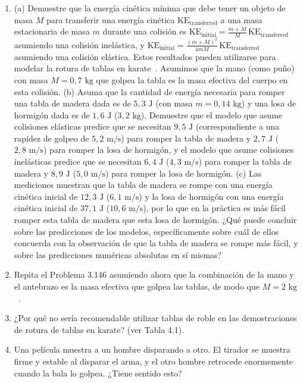 \documentclass[12pt]{book}
\begin{document}
\begin{enumerate}
\item[3.146] (a) Demuestre que la energía cinética mínima que debe tener un objeto de masa $M$ para transferir una energía cinética $\text{KE}_{\text{transferred}}$ a una masa estacionaria de masa $m$ durante una colisión es $\text{KE}_{\text{initial}} = \frac{m + M}{M}\,\text{KE}_{\text{transferred}}$ asumiendo una colisión inelástica, y $\text{KE}_{\text{initial}} = \frac{(m + M)^2}{4mM}\,\text{KE}_{\text{transferred}}$ asumiendo una colisión elástica. Estos resultados pueden utilizarse para modelar la rotura de tablas en karate~\cite{ref144}. Asumimos que la mano (como puño) con masa $M = 0{,}7\text{ kg}$ que golpea la tabla es la masa efectiva del cuerpo en esta colisión.
\newline
(b) Asuma que la cantidad de energía necesaria para romper una tabla de madera dada es de $5{,}3\text{ J}$ (con masa $m = 0{,}14\text{ kg}$) y una losa de hormigón dada es de $1{,}6\text{ J}$ ($3{,}2\text{ kg}$). Demuestre que el modelo que asume colisiones elásticas predice que se necesitan $9{,}5\text{ J}$ (correspondiente a una rapidez de golpeo de $5{,}2\text{ m/s}$) para romper la tabla de madera y $2{,}7\text{ J}$ ($2{,}8\text{ m/s}$) para romper la losa de hormigón, y el modelo que asume colisiones inelásticas predice que se necesitan $6{,}4\text{ J}$ ($4{,}3\text{ m/s}$) para romper la tabla de madera y $8{,}9\text{ J}$ ($5{,}0\text{ m/s}$) para romper la losa de hormigón.
\newline
(c) Las mediciones muestran que la tabla de madera se rompe con una energía cinética inicial de $12{,}3\text{ J}$ ($6{,}1\text{ m/s}$) y la losa de hormigón con una energía cinética inicial de $37{,}1\text{ J}$ ($10{,}6\text{ m/s}$), por lo que en la práctica es más fácil romper esta tabla de madera que esta losa de hormigón. ¿Qué puede concluir sobre las predicciones de los modelos, específicamente sobre cuál de ellos concuerda con la observación de que la tabla de madera se rompe más fácil, y sobre las predicciones numéricas absolutas en sí mismas?

\item[3.147] Repita el Problema 3.146 asumiendo ahora que la combinación de la mano y el antebrazo es la masa efectiva que golpea las tablas, de modo que $M = 2\text{ kg}$~\cite{ref144}.

\item[3.148] ¿Por qué no sería recomendable utilizar tablas de roble en las demostraciones de rotura de tablas en karate? (ver Tabla 4.1).

\item[3.149] Una película muestra a un hombre disparando a otro. El tirador se muestra firme y estable al disparar el arma, y el otro hombre retrocede enormemente cuando la bala lo golpea. ¿Tiene sentido esto?


\end{enumerate}
\end{document}
